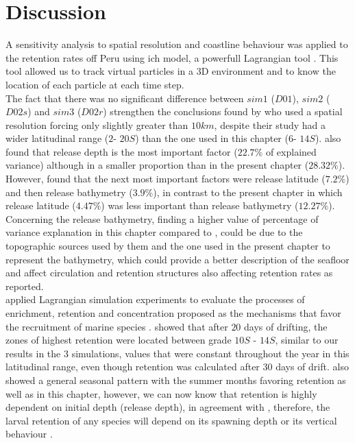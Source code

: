 \clearpage
\section{Discussion}\label{Chap2Disc}

A sensitivity analysis to spatial resolution and coastline behaviour was applied to the retention rates off Peru using \gls{ich} model, a powerfull Lagrangian tool \citep{LettVerl2008}. This tool allowed us to track virtual particles in a 3D environment and to know the location of each particle at each time step.\\

The fact that there was no significant difference between $sim 1$ ($D01$), $sim 2$ ($D02s$) and $sim 3$ ($D02r$) strengthen the conclusions found by \citep{BrocLett2008} who used a spatial resolution forcing only slightly greater than $10 km$, despite their study had a wider latitudinal range ($2$\textdegree - $20$\textdegree $S$) than the one used in this chapter ($6$\textdegree - $14$\textdegree $S$). \cite{BrocLett2008} also found that release depth is the most important factor ($22.7 \%$ of explained variance) although in a smaller proportion than in the present chapter ($28.32 \%$). However, \cite{BrocLett2008} found that the next most important factors were release latitude ($7.2 \%$) and then release bathymetry ($3.9 \%$), in contrast to the present chapter in which release latitude ($4.47 \%$) was less important than release bathymetry ($12.27 \%$). Concerning the release bathymetry, finding a higher value of percentage of variance explanation in this chapter compared to \cite{BrocLett2008}, could be due to the topographic sources \citep{SmitSand1997} used by them and the one used in the present chapter \citep{BeckSand2009} to represent the bathymetry, which could provide a better description of the seafloor and affect circulation and retention structures also affecting retention rates as \cite{RojaLand2014} reported.\\

\cite{LettPenv2007} applied Lagrangian simulation experiments to evaluate the processes of enrichment, retention and concentration proposed as the mechanisms that favor the recruitment of marine species \citep{Baku1998, Baku2010}. \cite{LettPenv2007} showed that after $20$ days of drifting, the zones of highest retention were located between grade $10$\textdegree $S$ - $14$\textdegree $S$, similar to our results in the $3$ simulations, values that were constant throughout the year in this latitudinal range, even though retention was calculated after $30$ days of drift. \cite{LettPenv2007} also showed a general seasonal pattern with the summer months favoring retention as well as in this chapter, however, we can now know that retention is highly dependent on initial depth (release depth), in agreement with \cite{BrocLett2008}, therefore, the larval retention of any species will depend on its spawning depth or its vertical behaviour \citep{OspiPara2012}.\\

